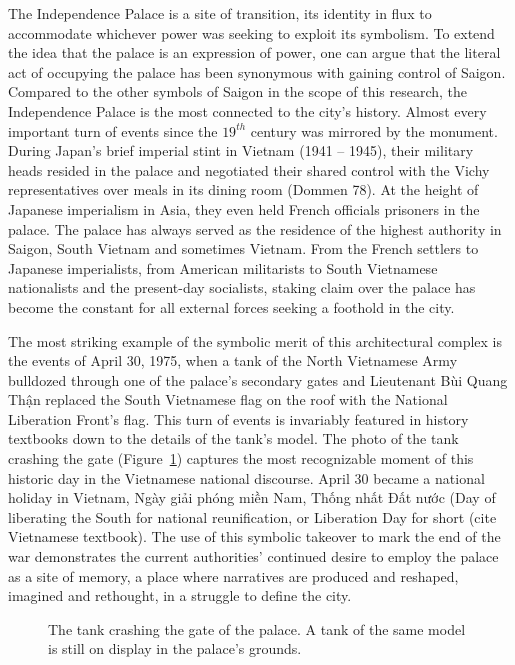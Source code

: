 \vi The Independence Palace is a site of transition, its identity in flux to accommodate whichever power was seeking to exploit its symbolism. To extend the idea that the palace is an expression of power, one can argue that the literal act of occupying the palace has been synonymous with gaining control of Saigon. Compared to the other symbols of Saigon in the scope of this research, the Independence Palace is the most connected to the city’s history. Almost every important turn of events since the $19^{th}$ century was mirrored by the monument. During Japan’s brief imperial stint in Vietnam (1941 – 1945), their military heads resided in the palace and negotiated their shared control with the Vichy representatives over meals in its dining room (Dommen 78). At the height of Japanese imperialism in Asia, they even held French officials prisoners in the palace. The palace has always served as the residence of the highest authority in Saigon, South Vietnam and sometimes Vietnam. From the French settlers to Japanese imperialists, from American militarists to South Vietnamese nationalists and the present-day socialists, staking claim over the palace has become the constant for all external forces seeking a foothold in the city.

The most striking example of the symbolic merit of this architectural complex is the events of April 30, 1975, when a tank of the North Vietnamese Army bulldozed through one of the palace’s secondary gates and Lieutenant Bùi Quang Thận replaced the South Vietnamese flag on the roof with the National Liberation Front’s flag. This turn of events is invariably featured in history textbooks down to the details of the tank’s model. The photo of the tank crashing the gate (Figure~\ref{tank}) captures the most recognizable moment of this historic day in the Vietnamese national discourse. April 30  became a national holiday in Vietnam, Ngày giải phóng miền Nam, Thống nhất Đất nước (Day of liberating the South for national reunification, or Liberation Day for short (cite Vietnamese textbook). The use of this symbolic takeover to mark the end of the war demonstrates the current authorities’ continued desire to employ the palace as a site of memory, a place where narratives are produced and reshaped, imagined and rethought, in a struggle to define the city. \en

\begin{figure}[!ht]
\begin{center}
\vspace{-.2 in}
\caption{\vi The tank crashing the gate of the palace. A tank of the same model is still on display in the palace's grounds.}\label{tank}
\end{center}
\vspace{-.2 in}
\end{figure}

